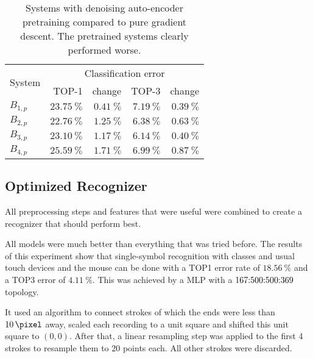 \documentclass[9pt,technote]{IEEEtran}
\begin{document}
\begin{table}[tb]
    \centering
    \begin{tabular}{lrrrr}
    \toprule
    \multirow{2}{*}{System}  & \multicolumn{4}{c}{Classification error}\\
    \cmidrule(l){2-5}
              & TOP-1                  & change                 & TOP-3                 & change                 \\\midrule
    $B_{1,p}$ & $\SI{23.75}{\percent}$ & $\SI{+0.41}{\percent}$ & $\SI{7.19}{\percent}$ & $\SI{+0.39}{\percent}$\\
    $B_{2,p}$ & \underline{$\SI{22.76}{\percent}$} & $\SI{+1.25}{\percent}$ & $\SI{6.38}{\percent}$ & $\SI{+0.63}{\percent}$\\
    $B_{3,p}$ & $\SI{23.10}{\percent}$ & $\SI{+1.17}{\percent}$ & \underline{$\SI{6.14}{\percent}$} & $\SI{+0.40}{\percent}$\\
    $B_{4,p}$ & $\SI{25.59}{\percent}$ & $\SI{+1.71}{\percent}$ & $\SI{6.99}{\percent}$ & $\SI{+0.87}{\percent}$\\
    \bottomrule
    \end{tabular}
    \caption{Systems with denoising auto-encoder pretraining compared to pure
             gradient descent. The pretrained systems clearly performed worse.}
\label{table:pretraining-denoising-auto-encoder}
\end{table}

\subsection{Optimized Recognizer}
All preprocessing steps and features that were useful were combined to
create a recognizer that should perform best.

All models were much better than everything that was tried before. The results
of this experiment show that single-symbol recognition with
\totalClassesAnalyzed{} classes and usual touch devices and the mouse can be
done with a TOP1 error rate of $\SI{18.56}{\percent}$ and a TOP3 error of
$\SI{4.11}{\percent}$. This was
achieved by a \gls{MLP} with a $167{:}500{:}500{:}369{}$ topology.

It used an algorithm to connect strokes of which the ends were less than
$\SI{10}{\pixel}$ away, scaled each recording to a unit square and shifted this
unit square to $(0,0)$. After that, a linear resampling step was applied to the
first 4 strokes to resample them to 20 points each. All other strokes were
discarded.
\end{document}
